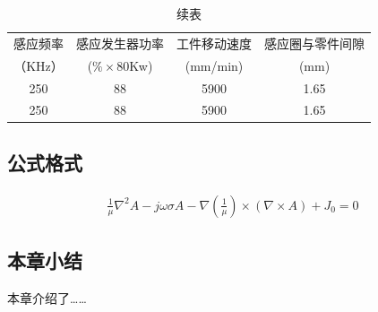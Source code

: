 \begin{table}
\centering
\captionsetup{singlelinecheck=off}
\caption*{续表} %
\begin{tabular}{|c| c|c|c|}
\hline
感应频率 &感应发生器功率 & 工件移动速度  &感应圈与零件间隙\\
（KHz）&($\% \times$80Kw) &(mm/min)  &(mm)\\
\hline
250 &88 &5900 &1.65\\
\hline
250 &88 &5900 &1.65\\
\hline
\end{tabular}
\end{table}


\subsection{公式格式}

\vspace{-10mm}
\begin{eqnarray}
\frac{1}{\mu} \nabla^2A - j \omega \sigma A -\nabla(\frac{1}{\mu}) \times(\nabla \times A)+J_0=0
\end{eqnarray}

\subsection{本章小结}
本章介绍了……

\newpage